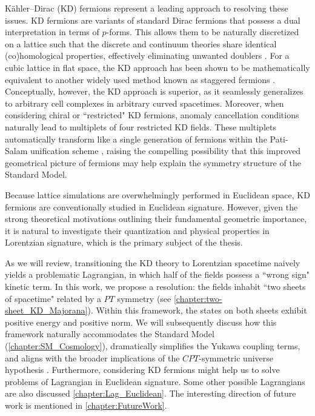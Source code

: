 Kähler–Dirac (KD) fermions \cite{Kähler1962} represent a leading approach to resolving these issues. KD fermions are variants of standard Dirac fermions that possess a dual interpretation in terms of $p$-forms. This allows them to be naturally discretized on a lattice such that the discrete and continuum theories share identical (co)homological properties, effectively eliminating unwanted doublers \cite{RABIN1982315, Becher1982TheDE, Montvay:1994cy}. For a cubic lattice in flat space, the KD approach has been shown \cite{Becher1982TheDE} to be mathematically equivalent to another widely used method known as staggered fermions \cite{Kogut:1974ag}. Conceptually, however, the KD approach is superior, as it seamlessly generalizes to arbitrary cell complexes in arbitrary curved spacetimes. Moreover, when considering chiral or ``restricted" KD fermions, anomaly cancellation conditions naturally lead to multiplets of four restricted KD fields. These multiplets automatically transform like a single generation of fermions within the Pati-Salam unification scheme \cite{Catterall:2022jky, Catterall:2023nww}, raising the compelling possibility that this improved geometrical picture of fermions may help explain the symmetry structure of the Standard Model.

Because lattice simulations are overwhelmingly performed in Euclidean space, KD fermions are conventionally studied in Euclidean signature. However, given the strong theoretical motivations outlining their fundamental geometric importance, it is natural to investigate their quantization and physical properties in Lorentzian signature, which is the primary subject of the thesis.

As we will review, transitioning the KD theory to Lorentzian spacetime naively yields a problematic Lagrangian, in which half of the fields possess a ``wrong sign" kinetic term. In this work, we propose a resolution: the fields inhabit ``two sheets of spacetime" related by a $PT$ symmetry (see \cref{chapter:two-sheet_KD_Majorana}). Within this framework, the states on both sheets exhibit positive energy and positive norm. We will subsequently discuss how this framework naturally accommodates the Standard Model (\cref{chapter:SM_Cosmology}), dramatically simplifies the Yukawa coupling terms, and aligns with the broader implications of the $CPT$-symmetric universe hypothesis \cite{Boyle:2018tzc, Boyle:2018rgh, Turok:2022fgq, Boyle:2022lcq}. Furthermore, considering KD fermions might help us to solve problems of Lagrangian in Euclidean signature. Some other possible Lagrangians are also discussed \cref{chapter:Lag_Euclidean}. The interesting direction of future work is mentioned in \cref{chapter:FutureWork}.


